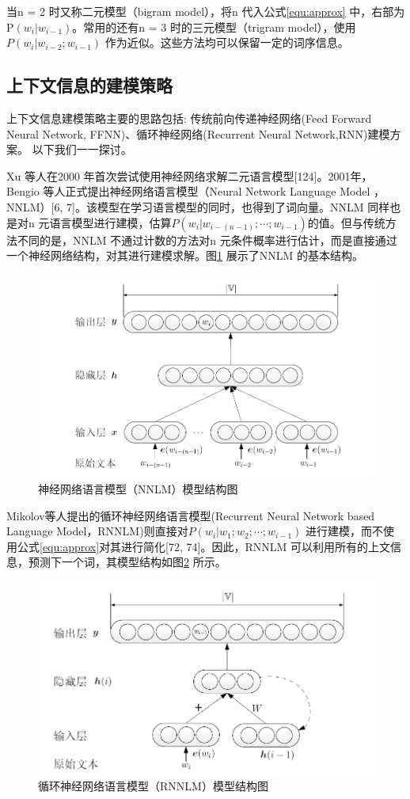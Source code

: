 \documentclass[12pt,a4paper]{article}
\begin{document}
当n = 2 时又称二元模型（bigram model），将n 代入公式\ref{equ:approx} 中，右部为P$(w_i|w_{i-1})$。常用的还有n = 3 时的三元模型（trigram model），使用$P(w_i |w_{i-2};w_{i-1})$ 作为近似。这些方法均可以保留一定的词序信息。

\subsection{上下文信息的建模策略}
上下文信息建模策略主要的思路包括: 传统前向传递神经网络(Feed Forward Neural Network, FFNN)、循环神经网络(Recurrent Neural Network,RNN)建模方案。 以下我们一一探讨。

Xu 等人在2000 年首次尝试使用神经网络求解二元语言模型[124]。2001年，Bengio 等人正式提出神经网络语言模型（Neural Network Language Model ，NNLM）[6, 7]。该模型在学习语言模型的同时，也得到了词向量。NNLM 同样也是对n 元语言模型进行建模，估算$P(w_i | w_{i-(n-1)}; \cdots ;w_{i-1})$的值。但与传统方法不同的是，NNLM 不通过计数的方法对n 元条件概率进行估计，而是直接通过一个神经网络结构，对其进行建模求解。图\ref{fig:ffnn} 展示了NNLM 的基本结构。

\begin{figure}
  \centering
  \includegraphics[width=0.8\linewidth]{./figures/ffnn.png}
  \caption{神经网络语言模型（NNLM）模型结构图}\label{fig:ffnn}
\end{figure}

Mikolov等人提出的循环神经网络语言模型(Recurrent Neural Network based Language Model，RNNLM)则直接对$P(w_i | w_1;w_2;\cdots;w_{i-1}) $ 进行建模，而不使用公式\ref{equ:approx}对其进行简化[72, 74]。因此，RNNLM 可以利用所有的上文信息，预测下一个词，其模型结构如图\ref{fig:rnnlm} 所示。
\begin{figure}
  \centering
  \includegraphics[width=0.85\linewidth]{./figures/rnnlm.png}
  \caption{循环神经网络语言模型（RNNLM）模型结构图}\label{fig:rnnlm}
\end{figure}
\end{document}
